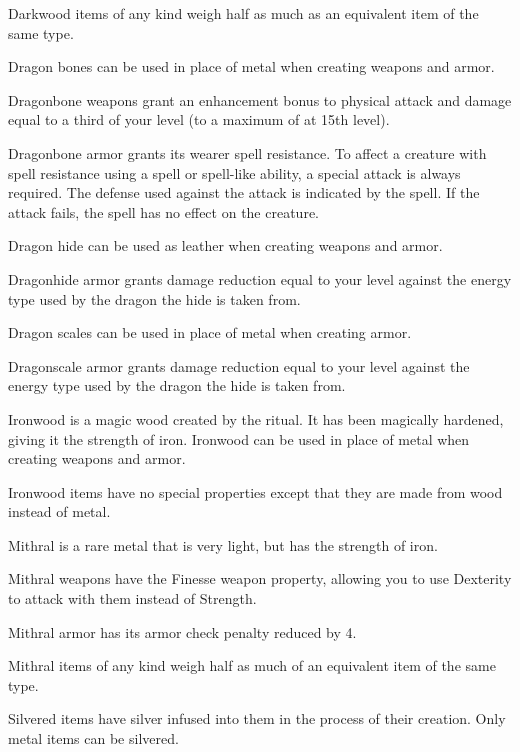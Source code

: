 Darkwood items of any kind weigh half as much as an equivalent item of the same type.


Dragon bones can be used in place of metal when creating weapons and armor.

Dragonbone weapons grant an enhancement bonus to physical attack and damage equal to a third of your level (to a maximum of  at 15th level).

Dragonbone armor grants its wearer spell resistance. To affect a creature with spell resistance using a spell or spell-like ability, a special attack is always required. The defense used against the attack is indicated by the spell. If the attack fails, the spell has no effect on the creature.


Dragon hide can be used as leather when creating weapons and armor.

Dragonhide armor grants damage reduction equal to your level against the energy type used by the dragon the hide is taken from.


Dragon scales can be used in place of metal when creating armor.

Dragonscale armor grants damage reduction equal to your level against the energy type used by the dragon the hide is taken from.

Ironwood is a magic wood created by the  ritual. It has been magically hardened, giving it the strength of iron. Ironwood can be used in place of metal when creating weapons and armor.

Ironwood items have no special properties except that they are made from wood instead of metal.

Mithral is a rare metal that is very light, but has the strength of iron.

Mithral weapons have the Finesse weapon property, allowing you to use Dexterity to attack with them instead of Strength.

Mithral armor has its armor check penalty reduced by 4.

Mithral items of any kind weigh half as much of an equivalent item of the same type.


Silvered items have silver infused into them in the process of their creation. Only metal items can be silvered.

